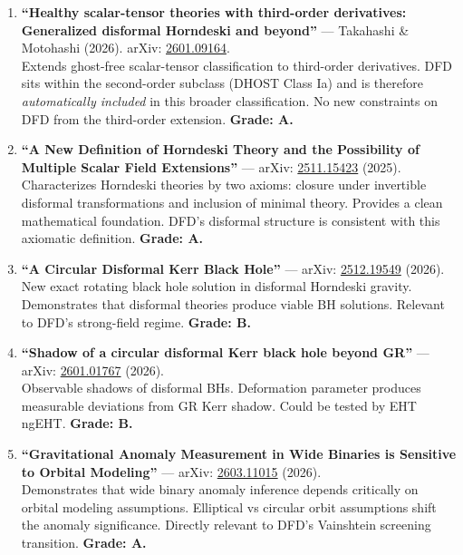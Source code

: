 \documentclass[11pt,a4paper]{article}
\begin{document}
\begin{enumerate}
\item \textbf{``Healthy scalar-tensor theories with third-order derivatives: Generalized disformal Horndeski and beyond''} --- Takahashi \& Motohashi (2026). arXiv: \href{https://arxiv.org/abs/2601.09164}{2601.09164}.\\
Extends ghost-free scalar-tensor classification to third-order derivatives. DFD sits within the second-order subclass (DHOST Class Ia) and is therefore \emph{automatically included} in this broader classification. No new constraints on DFD from the third-order extension. \textbf{Grade: A.}

\item \textbf{``A New Definition of Horndeski Theory and the Possibility of Multiple Scalar Field Extensions''} --- arXiv: \href{https://arxiv.org/abs/2511.15423}{2511.15423} (2025).\\
Characterizes Horndeski theories by two axioms: closure under invertible disformal transformations and inclusion of minimal theory. Provides a clean mathematical foundation. DFD's disformal structure is consistent with this axiomatic definition. \textbf{Grade: A.}

\item \textbf{``A Circular Disformal Kerr Black Hole''} --- arXiv: \href{https://arxiv.org/abs/2512.19549}{2512.19549} (2026).\\
New exact rotating black hole solution in disformal Horndeski gravity. Demonstrates that disformal theories produce viable BH solutions. Relevant to DFD's strong-field regime. \textbf{Grade: B.}

\item \textbf{``Shadow of a circular disformal Kerr black hole beyond GR''} --- arXiv: \href{https://arxiv.org/abs/2601.01767}{2601.01767} (2026).\\
Observable shadows of disformal BHs. Deformation parameter produces measurable deviations from GR Kerr shadow. Could be tested by EHT ngEHT. \textbf{Grade: B.}

\item \textbf{``Gravitational Anomaly Measurement in Wide Binaries is Sensitive to Orbital Modeling''} --- arXiv: \href{https://arxiv.org/abs/2603.11015}{2603.11015} (2026).\\
Demonstrates that wide binary anomaly inference depends critically on orbital modeling assumptions. Elliptical vs circular orbit assumptions shift the anomaly significance. Directly relevant to DFD's Vainshtein screening transition. \textbf{Grade: A.}
\end{enumerate}
\end{document}
